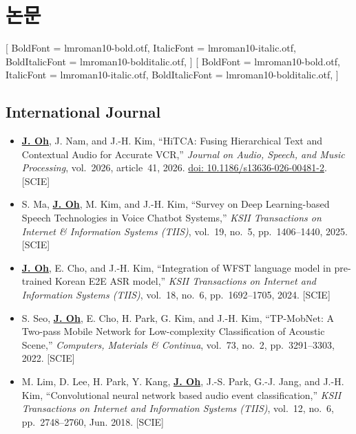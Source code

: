 \documentclass[a4paper,9pt]{extarticle}
\newcommand{\setseriffonts}{%
  \setmainfont{lmroman10-regular.otf}[
    BoldFont = lmroman10-bold.otf,
    ItalicFont = lmroman10-italic.otf,
    BoldItalicFont = lmroman10-bolditalic.otf,
  ]%
  \setmainhangulfont{lmroman10-regular.otf}[
    BoldFont = lmroman10-bold.otf,
    ItalicFont = lmroman10-italic.otf,
    BoldItalicFont = lmroman10-bolditalic.otf,
  ]%
}
\newenvironment{latinblock}{%
  \begingroup\setseriffonts
}{%
  \endgroup
}
\newenvironment{blockitems}{%
  \begin{itemize}[leftmargin=1.5em, itemsep=7pt, topsep=4pt, parsep=0pt, partopsep=0pt]
}{%
  \end{itemize}
}
\newcommand{\me}[1]{\textbf{\underline{#1}}}
\begin{document}
\section*{논문}
\begin{latinblock}
\subsection*{International Journal}
\begin{blockitems}
  \item \me{J. Oh}, J. Nam, and J.-H. Kim, ``HiTCA: Fusing Hierarchical Text and Contextual Audio for Accurate VCR,'' \textit{Journal on Audio, Speech, and Music Processing}, vol.~2026, article~41, 2026. \href{https://doi.org/10.1186/s13636-026-00481-2}{doi: 10.1186/s13636-026-00481-2}. [SCIE]
  \item S. Ma, \me{J. Oh}, M. Kim, and J.-H. Kim, ``Survey on Deep Learning-based Speech Technologies in Voice Chatbot Systems,'' \textit{KSII Transactions on Internet \& Information Systems (TIIS)}, vol.~19, no.~5, pp.~1406--1440, 2025. [SCIE]
  \item \me{J. Oh}, E. Cho, and J.-H. Kim, ``Integration of WFST language model in pre-trained Korean E2E ASR model,'' \textit{KSII Transactions on Internet and Information Systems (TIIS)}, vol.~18, no.~6, pp.~1692--1705, 2024. [SCIE]
  \item S. Seo, \me{J. Oh}, E. Cho, H. Park, G. Kim, and J.-H. Kim, ``TP-MobNet: A Two-pass Mobile Network for Low-complexity Classification of Acoustic Scene,'' \textit{Computers, Materials \& Continua}, vol.~73, no.~2, pp.~3291--3303, 2022. [SCIE]
  \item M. Lim, D. Lee, H. Park, Y. Kang, \me{J. Oh}, J.-S. Park, G.-J. Jang, and J.-H. Kim, ``Convolutional neural network based audio event classification,'' \textit{KSII Transactions on Internet and Information Systems (TIIS)}, vol.~12, no.~6, pp.~2748--2760, Jun. 2018. [SCIE]
\end{blockitems}


\end{latinblock}
\end{document}
